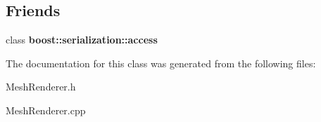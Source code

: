 \subsection*{Friends}
\begin{DoxyCompactItemize}
\item 
\hypertarget{class_mesh_renderer_ac98d07dd8f7b70e16ccb9a01abf56b9c}{
class {\bfseries boost::serialization::access}}
\label{class_mesh_renderer_ac98d07dd8f7b70e16ccb9a01abf56b9c}

\end{DoxyCompactItemize}


The documentation for this class was generated from the following files:\begin{DoxyCompactItemize}
\item 
MeshRenderer.h\item 
MeshRenderer.cpp\end{DoxyCompactItemize}
